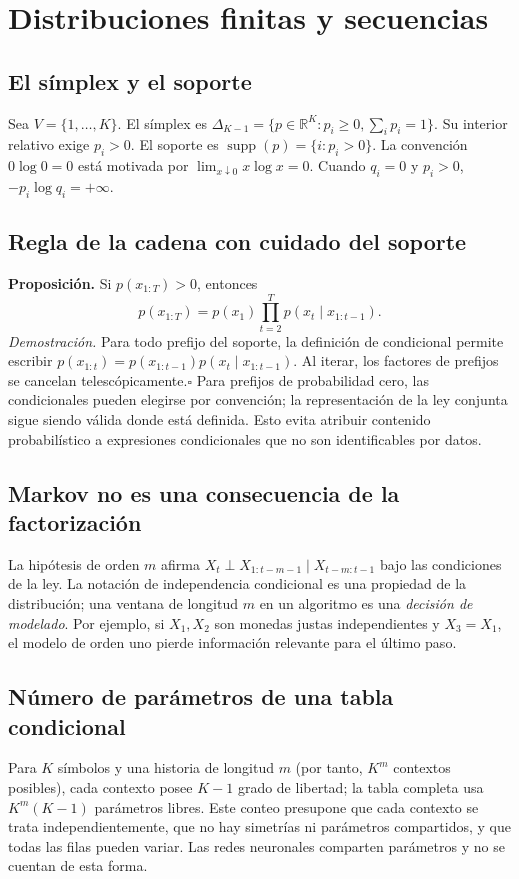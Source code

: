 \label{mod:sup}
\chapter{Distribuciones finitas y secuencias}
\section{El símplex y el soporte}
Sea $V=\{1,\ldots,K\}$. El símplex es
$\Delta_{K-1}=\{p\in\mathbb R^K:p_i\ge0,\sum_i p_i=1\}$.
Su interior relativo exige $p_i>0$. El soporte es
$\operatorname{supp}(p)=\{i:p_i>0\}$. La convención
$0\log0=0$ está motivada por $\lim_{x\downarrow0}x\log x=0$.
Cuando $q_i=0$ y $p_i>0$, $-p_i\log q_i=+\infty$.
\section{Regla de la cadena con cuidado del soporte}
\textbf{Proposición.} Si $p(x_{1:T})>0$, entonces
\[p(x_{1:T})=p(x_1)\prod_{t=2}^T p(x_t\mid x_{1:t-1}).\]
\textit{Demostración.} Para todo prefijo del soporte, la definición de
condicional permite escribir
$p(x_{1:t})=p(x_{1:t-1})p(x_t\mid x_{1:t-1})$.
Al iterar, los factores de prefijos se cancelan telescópicamente.\hfill$\square$
Para prefijos de probabilidad cero, las condicionales pueden elegirse por
convención; la representación de la ley conjunta sigue siendo válida donde
está definida. Esto evita atribuir contenido probabilístico a expresiones
condicionales que no son identificables por datos.
\section{Markov no es una consecuencia de la factorización}
La hipótesis de orden $m$ afirma
$X_t\perp X_{1:t-m-1}\mid X_{t-m:t-1}$ bajo las condiciones de la ley.
La notación de independencia condicional es una propiedad de la distribución;
una ventana de longitud $m$ en un algoritmo es una \emph{decisión de modelado}.
Por ejemplo, si $X_1,X_2$ son monedas justas independientes y $X_3=X_1$,
el modelo de orden uno pierde información relevante para el último paso.
\section{Número de parámetros de una tabla condicional}
Para $K$ símbolos y una historia de longitud $m$ (por tanto, $K^m$ contextos posibles), cada contexto posee $K-1$
grado de libertad; la tabla completa usa $K^m(K-1)$ parámetros libres.
Este conteo presupone que cada contexto se trata independientemente, que no
hay simetrías ni parámetros compartidos, y que todas las filas pueden variar.
Las redes neuronales comparten parámetros y no se cuentan de esta forma.

